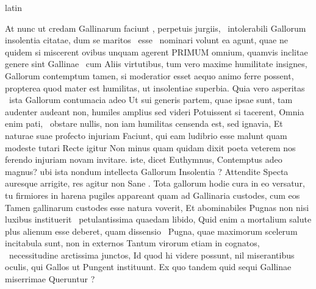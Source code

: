 \documentclass[12pt]{book}
\renewenvironment{latin}
    	{\begin{hyphenrules}{latin}}
    	{\end{hyphenrules}}
\begin{document}
\begin{pages}
\begin{latin}
\begin{Leftside}
                    At nunc ut credam Gallinarum faciunt , perpetuis jurgiis,  \ampersand\ intolerabili Gallorum insolentia citatae, 
                     dum se maritos  \ampersand\ esse  \ampersand\ nominari volunt ea   agunt, 
                    quae ne  quidem si miscerent ovibus unquam agerent PRIMUM omnium, quamvis inclitae genere sint Gallinae  \ampersand\ cum Aliis virtutibus, 
                    tum vero maxime humilitate insignes, Gallorum contemptum tamen, 
                    si moderatior esset aequo animo ferre possent, propterea quod  mater est humilitas, 
                    ut insolentiae superbia. Quia vero asperitas  \ampersand\ ista Gallorum contumacia adeo  
                    Ut sui generis partem, quae ipsae sunt, tam audenter  audeant non, humiles amplius  sed  videri Potuissent si tacerent, 
                    Omnia enim pati,  \ampersand\ obstare nullis, non iam humilitas censenda est, sed ignavia, 
                    Et naturae suae profecto injuriam Faciunt, qui eam ludibrio esse malunt quam modeste tutari 
                    Recte igitur Non minus quam  quidam dixit poeta veterem nos ferendo injuriam novam invitare. 
                     iste, dicet Euthymnus, Contemptus adeo magnus? 
                    ubi ista nondum intellecta Gallorum Insolentia ? 
                    Attendite  Specta auresque arrigite, res agitur non Sane . 
                    Tota gallorum hodie cura in eo versatur, tu firmiores in harena pugiles appareant quam ad Gallinaria custodes, 
                    cum eos Tamen gallinarum custodes esse natura voverit, Et abominabiles Pugnas non nisi luxibus instituerit  \ampersand\ petulantissima quaedam libido, 
                    Quid enim a mortalium salute plus alienum esse deberet, 
                    quam dissensio  \ampersand\ Pugna, quae maximorum scelerum incitabula sunt, non in externos Tantum virorum etiam in cognatos,  \ampersand\ necessitudine arctissima junctos, 
                    Id quod hi videre possunt, 
                    nil miserantibus oculis, qui Gallos ut Pungent instituunt. 
                    Ex quo tandem quid sequi Gallinae miserrimae Queruntur ? 

\end{Leftside}
\end{latin}
\end{pages}
\end{document}

